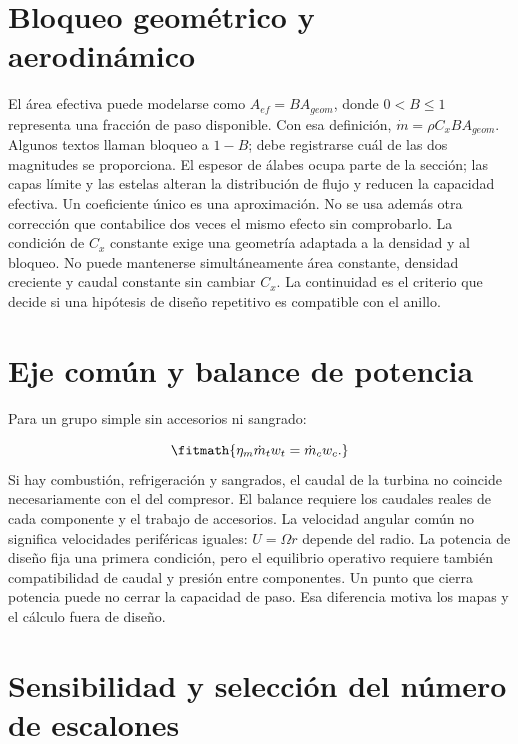 \documentclass[10pt,openany]{book}
\begin{document}
\section{Bloqueo geométrico y aerodinámico}

El área efectiva puede modelarse como \(A_{ef}=B A_{geom}\), donde \(0<B\leq1\) representa una fracción de paso disponible. Con esa definición, \(\dot m=\rho C_xB A_{geom}\). Algunos textos llaman bloqueo a \(1-B\); debe registrarse cuál de las dos magnitudes se proporciona.
El espesor de álabes ocupa parte de la sección; las capas límite y las estelas alteran la distribución de flujo y reducen la capacidad efectiva. Un coeficiente único es una aproximación. No se usa además otra corrección que contabilice dos veces el mismo efecto sin comprobarlo.
La condición de \(C_x\) constante exige una geometría adaptada a la densidad y al bloqueo. No puede mantenerse simultáneamente área constante, densidad creciente y caudal constante sin cambiar \(C_x\). La continuidad es el criterio que decide si una hipótesis de diseño repetitivo es compatible con el anillo.

\section{Eje común y balance de potencia}


Para un grupo simple sin accesorios ni sangrado:



\[
\fitmath{\eta_m\dot m_t w_t=\dot m_c w_c.}
\]
Si hay combustión, refrigeración y sangrados, el caudal de la turbina no coincide necesariamente con el del compresor. El balance requiere los caudales reales de cada componente y el trabajo de accesorios. La velocidad angular común no significa velocidades periféricas iguales: \(U=\Omega r\) depende del radio.
La potencia de diseño fija una primera condición, pero el equilibrio operativo requiere también compatibilidad de caudal y presión entre componentes. Un punto que cierra potencia puede no cerrar la capacidad de paso. Esa diferencia motiva los mapas y el cálculo fuera de diseño.

\section{Sensibilidad y selección del número de escalones}
\end{document}
